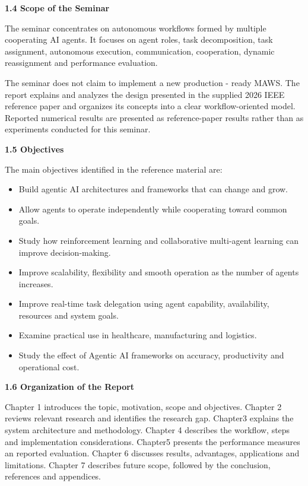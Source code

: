 \documentclass[12pt,letterpaper]{article}
\newcommand{\sectiontitle}[1]{%
  \vspace{6pt}%
  {\noindent\fontsize{13.2pt}{16pt}\selectfont\bfseries #1\par}%
  \vspace{2pt}%
}
\begin{document}
\sectiontitle{1.4 Scope of the Seminar}
The seminar concentrates on autonomous workflows formed by multiple cooperating AI agents. It focuses on agent roles, task decomposition, task assignment, autonomous execution, communication, cooperation, dynamic reassignment and performance evaluation.

The seminar does not claim to implement a new production - ready MAWS. The report explains and analyzes the design presented in the supplied 2026 IEEE reference paper and organizes its concepts into a clear workflow-oriented model. Reported numerical results are presented as reference-paper results rather than as experiments conducted for this seminar.
\newpage

\sectiontitle{1.5 Objectives}
The main objectives identified in the reference material are:
\begin{itemize}[leftmargin=18pt, label=$\bullet$, itemsep=4pt, parsep=0pt, topsep=2pt]
\item Build agentic AI architectures and frameworks that can change and grow.
\item Allow agents to operate independently while cooperating toward common goals.
\item Study how reinforcement learning and col\-lab\-o\-ra\-tive multi-agent learning can improve decision-making.
\item Improve scalability, flexibility and smooth operation as the number of agents increases.
\item Improve real-time task delegation using agent capability, availability, resources and system goals.
\item Examine practical use in healthcare, manufacturing and logistics.
\item Study the effect of Agentic AI frameworks on accuracy, productivity and operational cost.
\end{itemize}

\sectiontitle{1.6 Organization of the Report}
Chapter 1 introduces the topic, motivation, scope and objectives. Chapter 2 reviews relevant research and identifies the research gap. Chapter3 explains the system architecture and methodology. Chapter 4 describes the workflow, steps and implementation considerations. Chapter5 presents the performance measures an reported evaluation. Chapter 6 discusses results, advantages, applications and limitations. Chapter 7 describes future scope, followed by the conclusion, references and appendices.
\newpage
\end{document}
